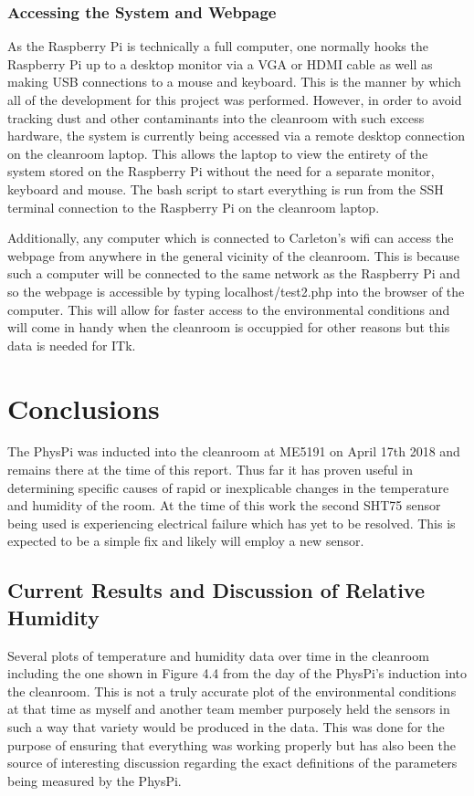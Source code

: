 \documentclass[letterpaper, 11pt]{report}
\begin{document}
\subsection{Accessing the System and Webpage}

As the Raspberry Pi is technically a full computer, one normally hooks the Raspberry Pi up to a desktop monitor via a VGA or HDMI cable as well as making USB connections to a mouse and keyboard.  This is the manner by which all of the development for this project was performed.  However, in order to avoid tracking dust and other contaminants into the cleanroom with such excess hardware, the system is currently being accessed via a remote desktop connection on the cleanroom laptop.  This allows the laptop to view the entirety of the system stored on the Raspberry Pi without the need for a separate monitor, keyboard and mouse.  The bash script to start everything is run from the SSH terminal connection to the Raspberry Pi on the cleanroom laptop.

Additionally, any computer which is connected to Carleton's wifi can access the webpage from anywhere in the general vicinity of the cleanroom.  This is because such a computer will be connected to the same network as the Raspberry Pi and so the webpage is accessible by typing localhost/test2.php into the browser of the computer.  This will allow for faster access to the environmental conditions and will come in handy when the cleanroom is occuppied for other reasons but this data is needed for ITk.


\chapter{Conclusions}

The PhysPi was inducted into the cleanroom at ME5191 on April 17th 2018 and remains there at the time of this report.  Thus far it has proven useful in determining specific causes of rapid or inexplicable changes in the temperature and humidity of the room.  At the time of this work the second SHT75 sensor being used is experiencing electrical failure which has yet to be resolved.  This is expected to be a simple fix and likely will employ a new sensor.

\section{Current Results and Discussion of Relative Humidity}

Several plots of temperature and humidity data over time in the cleanroom including the one shown in Figure 4.4 from the day of the PhysPi's induction into the cleanroom.  This is not a truly accurate plot of the environmental conditions at that time as myself and another team member purposely held the sensors in such a way that variety would be produced in the data.  This was done for the purpose of ensuring that everything was working properly but has also been the source of interesting discussion regarding the exact definitions of the parameters being measured by the PhysPi.
\end{document}
